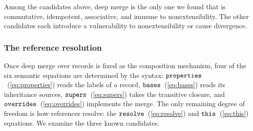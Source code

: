 \noindent
Among the candidates above, deep merge is the only one we found
that is commutative, idempotent, associative, and
immune to nonextensibility.
The other candidates each introduce a vulnerability to
nonextensibility or cause divergence.

\subsubsection*{The reference resolution}

Once deep merge over records is fixed as the composition
mechanism, four of the six semantic equations are determined
by the syntax:
$\mathtt{properties}$~(\ref{eq:properties}) reads the labels of a
record, $\mathtt{bases}$~(\ref{eq:bases}) reads its inheritance
sources, $\mathtt{supers}$~(\ref{eq:supers}) takes the transitive
closure, and $\mathtt{overrides}$~(\ref{eq:overrides}) implements
the merge.
The only remaining degree of freedom is how references
resolve: the $\mathtt{resolve}$~(\ref{eq:resolve}) and
$\mathtt{this}$~(\ref{eq:this}) equations.
We examine the three known candidates.

